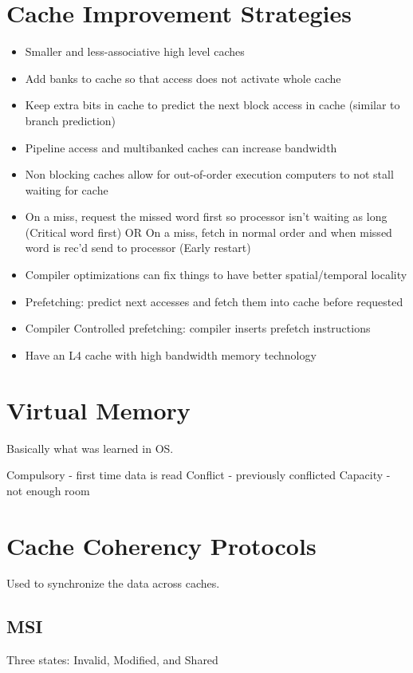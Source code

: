 \documentclass{article}
\begin{document}
\section{Cache Improvement Strategies}
\begin{itemize}
    \item Smaller and less-associative high level caches
    \item Add banks to cache so that access does not activate whole cache
    \item Keep extra bits in cache to predict the next block access in cache (similar to branch prediction)
    \item Pipeline access and multibanked caches can increase bandwidth
    \item Non blocking caches allow for out-of-order execution computers to not stall waiting for cache 
    \item On a miss, request the missed word first so processor isn't waiting as long (Critical word first) OR On a miss, fetch in normal order and when missed word is rec'd send to processor (Early restart) 
    \item Compiler optimizations can fix things to have better spatial/temporal locality 
    \item Prefetching: predict next accesses and fetch them into cache before requested 
    \item Compiler Controlled prefetching: compiler inserts prefetch instructions 
    \item Have an L4 cache with high bandwidth memory technology
\end{itemize}

\section {Virtual Memory}
Basically what was learned in OS.


Compulsory - first time data is read
Conflict -  previously conflicted
Capacity - not enough room

\section{Cache Coherency Protocols}

Used to synchronize the data across caches.

\subsection{MSI}
Three states: Invalid, Modified, and Shared
\end{document}
